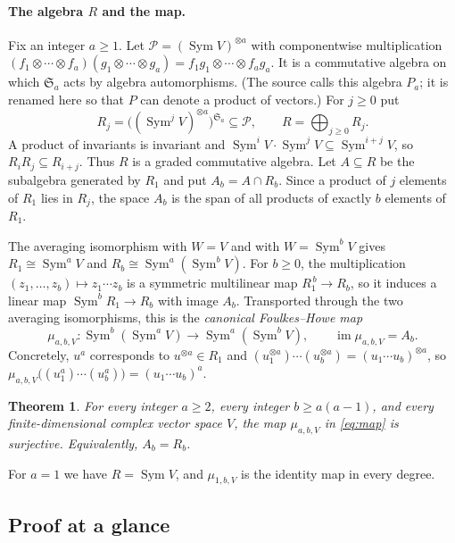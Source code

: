 \documentclass[11pt]{article}
\newtheorem{theorem}{Theorem}
\theoremstyle{definition}
\theoremstyle{remark}
\DeclareMathOperator{\Sym}{Sym}
\newcommand{\Sa}{\mathfrak S_a}
\newcommand{\cP}{\mathcal P}
\begin{document}
\paragraph{The algebra $R$ and the map.}
Fix an integer $a\ge1$. Let $\cP=(\Sym V)^{\otimes a}$ with componentwise
multiplication
$(f_1\otimes\cdots\otimes f_a)(g_1\otimes\cdots\otimes g_a)
=f_1g_1\otimes\cdots\otimes f_ag_a$. It is a commutative algebra on which
$\Sa$ acts by algebra automorphisms. (The source calls this algebra $P_a$;
it is renamed here so that $P$ can denote a product of vectors.) For $j\ge0$
put
\[
 R_j=\bigl((\Sym^j V)^{\otimes a}\bigr)^{\Sa}\subseteq\cP,\qquad
 R=\bigoplus_{j\ge0}R_j .
\]
A product of invariants is invariant and
$\Sym^iV\cdot\Sym^jV\subseteq\Sym^{i+j}V$, so $R_iR_j\subseteq R_{i+j}$.
Thus $R$ is a graded commutative algebra. Let $A\subseteq R$ be the
subalgebra generated by $R_1$ and put $A_b=A\cap R_b$. Since a product of
$j$ elements of $R_1$ lies in $R_j$, the space $A_b$ is the span of all
products of exactly $b$ elements of $R_1$.

The averaging isomorphism with $W=V$ and with $W=\Sym^bV$ gives
$R_1\cong\Sym^aV$ and $R_b\cong\Sym^a(\Sym^bV)$. For $b\ge0$, the
multiplication $(z_1,\ldots,z_b)\mapsto z_1\cdots z_b$ is a symmetric
multilinear map $R_1^{\,b}\to R_b$, so it induces a linear map
$\Sym^bR_1\to R_b$ with image $A_b$. Transported through the two averaging
isomorphisms, this is the \emph{canonical Foulkes--Howe map}
\begin{equation}\label{eq:map}
 \mu_{a,b,V}:\Sym^b(\Sym^a V)\longrightarrow\Sym^a(\Sym^b V),
 \qquad \operatorname{im}\mu_{a,b,V}=A_b .
\end{equation}
Concretely, $u^a$ corresponds to $u^{\otimes a}\in R_1$ and
$(u_1^{\otimes a})\cdots(u_b^{\otimes a})=(u_1\cdots u_b)^{\otimes a}$, so
$\mu_{a,b,V}\bigl((u_1^a)\cdots(u_b^a)\bigr)=(u_1\cdots u_b)^a$.

\begin{theorem}\label{thm:main}
For every integer $a\ge2$, every integer $b\ge a(a-1)$, and every
finite-dimensional complex vector space $V$, the map
$\mu_{a,b,V}$ in \eqref{eq:map} is surjective. Equivalently, $A_b=R_b$.
\end{theorem}

For $a=1$ we have $R=\Sym V$, and $\mu_{1,b,V}$ is the identity map in every
degree.

\subsection{Proof at a glance}
\end{document}
